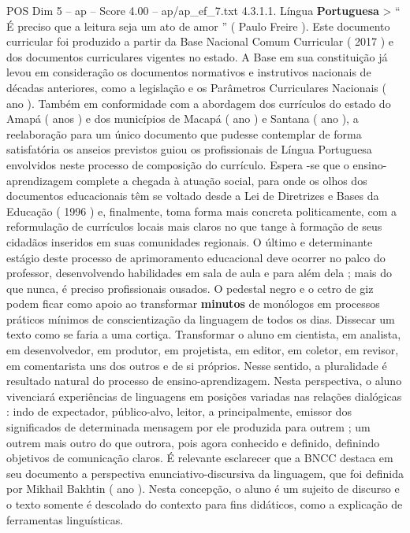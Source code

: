 \begin{textsample}{POS Dim 5 – ap – Score 4.00 – ap/ap\_ef\_7.txt}  \label{ex:f5_pos_170}
4.3.1.1.
Língua \textbf{Portuguesa} > “ É preciso que a leitura seja um ato de amor ” ( Paulo Freire ).
Este documento curricular foi produzido a partir da Base Nacional Comum Curricular ( 2017 ) e dos documentos curriculares vigentes no estado.
A Base em sua constituição já levou em consideração os documentos normativos e instrutivos nacionais de décadas anteriores, como a legislação e os Parâmetros Curriculares Nacionais ( ano ).
Também em conformidade com a abordagem dos currículos do estado do Amapá ( anos ) e dos municípios de Macapá ( ano ) e Santana ( ano ), a reelaboração para um único documento que pudesse contemplar de forma satisfatória os anseios previstos guiou os profissionais de Língua Portuguesa envolvidos neste processo de composição do currículo.
Espera -se que o ensino-aprendizagem complete a chegada à atuação social, para onde os olhos dos documentos educacionais têm se voltado desde a Lei de Diretrizes e Bases da Educação ( 1996 ) e, finalmente, toma forma mais concreta politicamente, com a reformulação de currículos locais mais claros no que tange à formação de seus cidadãos inseridos em suas comunidades regionais.
O último e determinante estágio deste processo de aprimoramento educacional deve ocorrer no palco do professor, desenvolvendo habilidades em sala de aula e para além dela ; mais do que nunca, é preciso profissionais ousados.
O pedestal negro e o cetro de giz podem ficar como apoio ao transformar \textbf{minutos} de monólogos em processos práticos mínimos de conscientização da linguagem de todos os dias.
Dissecar um texto como se faria a uma cortiça.
Transformar o aluno em cientista, em analista, em desenvolvedor, em produtor, em projetista, em editor, em coletor, em revisor, em comentarista uns dos outros e de si próprios.
Nesse sentido, a pluralidade é resultado natural do processo de ensino-aprendizagem.
Nesta perspectiva, o aluno vivenciará experiências de linguagens em posições variadas nas relações dialógicas : indo de expectador, público-alvo, leitor, a principalmente, emissor dos significados de determinada mensagem por ele produzida para outrem ; um outrem mais outro do que outrora, pois agora conhecido e definido, definindo objetivos de comunicação claros.
É relevante esclarecer que a BNCC destaca em seu documento a perspectiva enunciativo-discursiva da linguagem, que foi definida por Mikhail Bakhtin ( ano ).
Nesta concepção, o aluno é um sujeito de discurso e o texto somente é descolado do contexto para fins didáticos, como a explicação de ferramentas linguísticas.

\end{textsample}
